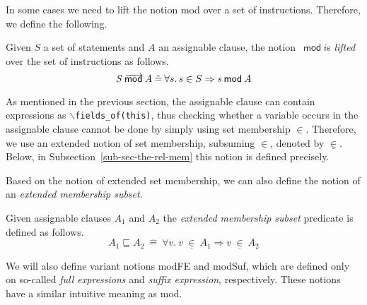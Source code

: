 \documentclass[a4paper]{llncs}
\newcommand{\defn}[1]{\:\hat{#1}\:}
\newcommand{\MOD}[2]{\ensuremath{\mathit{#1}\:\mathsf{mod}\:\ensuremath{\mathit{#2}}}}
\newcommand{\MODS}[2]{\ensuremath{\mathit{#1}\:\textsf{mod}\hspace*{-1.8em}\overrightarrow{\phantom{\mathsf{mop}}}\:\mathit{#2}}}
\newcommand{\extmember}[2]{\ensuremath{#1\: \underline\in\: #2}}
\newcommand{\extsubset}[2]{\ensuremath{#1 \sqsubseteq #2}}
\newcommand{\fieldsofarg}[1]{\texttt{\(\backslash\)fields\_of(#1)}}
\begin{document}
In some cases we need to lift the notion \textsf{mod} over a set of
instructions. Therefore, we define the following.

\begin{definition}
\label{def-mod-lis}
Given \(S\) a set of statements and \(A\) an assignable clause,
the notion \MOD\ is \emph{lifted} over the set of instructions as follows.
\[\MODS{S}{A} \defn{=}\forall s.\,s\in S\Rightarrow \MOD{s}{A}\]
\end{definition}

As mentioned in the previous section, the assignable clause can
contain expressions as
\fieldsofarg{this}, thus checking whether a
variable occurs in the assignable clause cannot be done by simply using set
membership \(\in\). Therefore, we use an extended notion of set
membership, subsuming \(\in\), denoted by \(\underline\in\). Below, in 
Subsection~\ref{sub-sec-the-rel-mem} this notion is defined precisely.

Based on the notion of extended set membership, we can also define the
notion of an \emph{extended membership subset}.

\begin{definition}
\label{def-subseq}
Given assignable clauses \(A_1\) and \(A_2\) the \emph{extended
membership subset} predicate is  defined as follows.
\[\extsubset{A_1}{A_2} \defn{=} \forall v.\ \extmember{v}{A_1}
\Rightarrow \extmember{v}{A_2}\]
\end{definition} 


We will also define variant notions \textsf{modFE} and
\textsf{modSuf}, which are defined only on so-called \emph{full
expressions} and \emph{suffix expression}, respectively. 
These notions have a similar intuitive meaning as
\textsf{mod}. 
\end{document}
